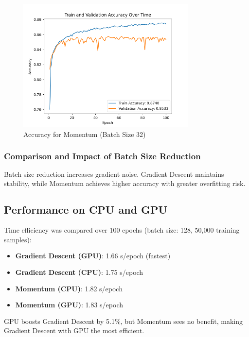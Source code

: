 \documentclass{article}
\begin{document}
\begin{figure}[H]
    \centering
    \includegraphics[width=0.8\textwidth]{assets/q2/momentum/accuracy_100_epochs_30k_train_split_batch_32.png}
    \caption{Accuracy for Momentum (Batch Size 32)}
    \label{fig:momentum_accuracy_32}
\end{figure}

\subsubsection{Comparison and Impact of Batch Size Reduction}

Batch size reduction increases gradient noise. Gradient Descent maintains stability, while Momentum achieves higher accuracy with greater overfitting risk.

\subsection{Performance on CPU and GPU}

Time efficiency was compared over 100 epochs (batch size: 128, 50,000 training samples):

\begin{itemize}
    \item \textbf{Gradient Descent (GPU)}: 1.66 s/epoch (fastest)
    \item \textbf{Gradient Descent (CPU)}: 1.75 s/epoch
    \item \textbf{Momentum (CPU)}: 1.82 s/epoch
    \item \textbf{Momentum (GPU)}: 1.83 s/epoch
\end{itemize}   

GPU boosts Gradient Descent by 5.1\%, but Momentum sees no benefit, making Gradient Descent with GPU the most efficient.
\end{document}
